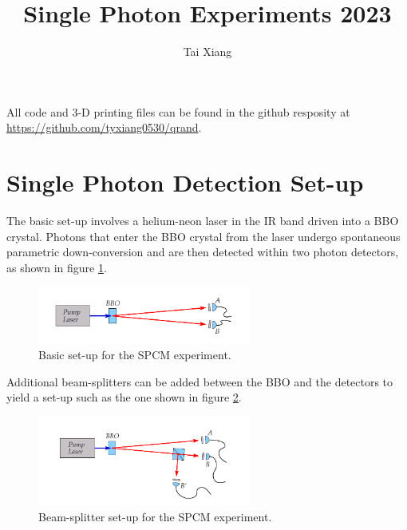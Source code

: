 \documentclass[letterpaper, 11 pt]{article}
\begin{document}
\title{Single Photon Experiments 2023}
\author{Tai Xiang}
\maketitle
\pagestyle{empty}

\tableofcontents
\newpage

All code and 3-D printing files can be found in the github resposity at \href{https://github.com/tyxiang0530/qrand}{https://github.com/tyxiang0530/qrand}.
\section{Single Photon Detection Set-up}

The basic set-up involves a helium-neon laser in the IR band driven into a BBO crystal. Photons that enter the BBO crystal from the laser
undergo spontaneous parametric down-conversion and are then detected within two photon detectors, as shown in figure \ref{fig:spcm_setup_basic}.
\begin{figure}[H]
    \centering
    \includegraphics[width = 7cm]{setup_basic.png}
    \caption{Basic set-up for the SPCM experiment.}
    \label{fig:spcm_setup_basic}
\end{figure}

Additional beam-splitters can be added between the BBO and the detectors to
yield a set-up such as the one shown in figure \ref{fig:spcm_setup_bs}.
\begin{figure}[H]
    \centering
    \includegraphics[width = 7cm]{setup.png}
    \caption{Beam-splitter set-up for the SPCM experiment.}
    \label{fig:spcm_setup_bs}
\end{figure}
\end{document}
